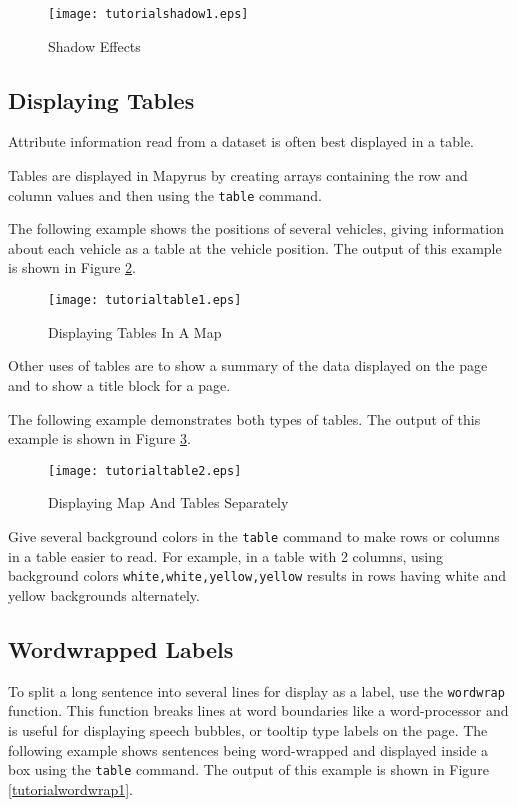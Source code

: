 \begin{figure}[htb]
\texttt{[image: tutorialshadow1.eps]}
\caption{Shadow Effects}
\label{tutorialshadow1}
\end{figure}

\subsection{Displaying Tables}

Attribute information read from a dataset is often best
displayed in a table.

Tables are displayed in Mapyrus by creating arrays containing
the row and column values and then using the \texttt{table} command.

The following example shows the positions of several vehicles,
giving information about each vehicle as a table at the vehicle
position.  The output of this example is shown in Figure \ref{tutorialtable1}.



\begin{figure}[htb]
\texttt{[image: tutorialtable1.eps]}
\caption{Displaying Tables In A Map}
\label{tutorialtable1}
\end{figure}

Other uses of tables are to show a summary of the data 
displayed on the page and to show a title block for a page.

The following example demonstrates both types of tables.
The output of this example is shown in Figure \ref{tutorialtable2}.



\begin{figure}[htb]
\texttt{[image: tutorialtable2.eps]}
\caption{Displaying Map And Tables Separately}
\label{tutorialtable2}
\end{figure}

Give several background colors in the \texttt{table} command to make rows or
columns in a table easier to read.  For example, in a table with 2 columns,
using background colors \texttt{white,white,yellow,yellow} results
in rows having white and yellow backgrounds alternately.

\subsection{Wordwrapped Labels}

To split a long sentence into several lines for display as a label, use
the \texttt{wordwrap} function.
This function breaks lines at word boundaries like a word-processor
and is useful for displaying speech bubbles, or tooltip type
labels on the page.
The following example shows sentences being word-wrapped and
displayed inside a box using the \texttt{table} command.
The output of this example
is shown in Figure \ref{tutorialwordwrap1}.


